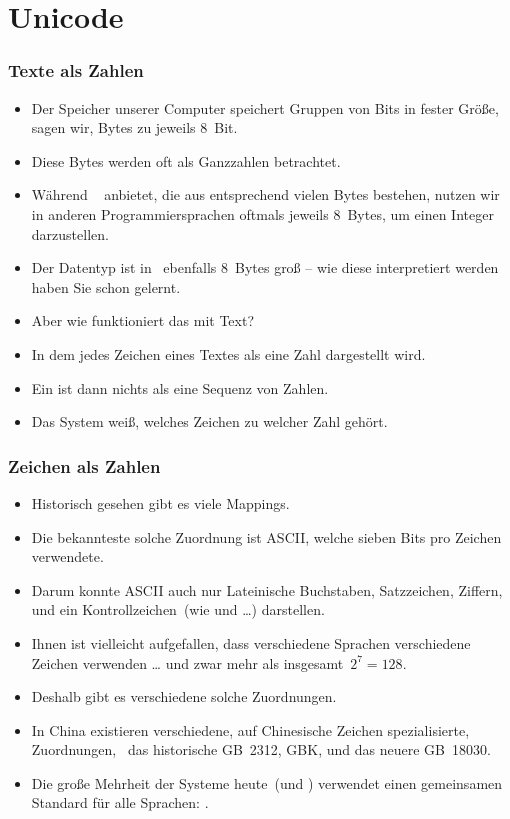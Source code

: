 \documentclass[aspectratio=169,mathserif,notheorems]{beamer}%
\begin{document}
\section{Unicode}%
%
\begin{frame}%
\frametitle{Texte als Zahlen}%
\begin{itemize}%
\item Der Speicher unserer Computer speichert Gruppen von Bits in fester Größe, sagen wir, Bytes zu jeweils 8~Bit.%
\item<2-> Diese Bytes werden oft als Ganzzahlen betrachtet.%
\item<3-> Während \python\   anbietet, die aus entsprechend vielen Bytes bestehen, nutzen wir in anderen Programmiersprachen oftmals jeweils 8~Bytes, um einen Integer darzustellen.
\item<4-> Der Datentyp  ist in \python\ ebenfalls 8~Bytes groß -- wie diese interpretiert werden haben Sie schon gelernt.%
\item<5-> Aber wie funktioniert das mit Text?%
\item<6-> In dem jedes Zeichen eines Textes als eine Zahl dargestellt wird.%
\item<7-> Ein  ist dann nichts als eine Sequenz von Zahlen.%
\item<8-> Das System weiß, welches Zeichen zu welcher Zahl gehört.
\end{itemize}%
\end{frame}%
%
\begin{frame}%
\frametitle{Zeichen als Zahlen}%
\begin{itemize}%
\item Historisch gesehen gibt es viele  Mappings.%
\item<2-> Die bekannteste solche Zuordnung ist ASCII\cite{ASA1963ASCII,USAS1967USCFII}, welche sieben Bits pro Zeichen verwendete.%
\item<3-> Darum konnte ASCII auch nur Lateinische Buchstaben, Satzzeichen, Ziffern, und ein Kontrollzeichen~(wie \textil{\\t} und \textil{\\n}\dots) darstellen.%
\item<4-> Ihnen ist vielleicht aufgefallen, dass verschiedene Sprachen verschiedene Zeichen verwenden {\dots} und zwar mehr als insgesamt~$2^7=128$.%
\item<5-> Deshalb gibt es verschiedene solche Zuordnungen.%
\item<6-> In China existieren verschiedene, auf Chinesische Zeichen spezialisierte, Zuordnungen, \DEzB\ das historische GB~2312\cite{GBT23121980PROCNSG21CCECSFIE}, GBK\cite{GBK1995CICSNSE}, und das neuere GB~18030\cite{GB180302022ITCCCS}.%
\item<7-> Die große Mehrheit der Systeme heute~(und \python) verwendet einen gemeinsamen Standard für \alert{alle} Sprachen: \cite{TUC2023U1510,TUC2023U151ACS,ISOIEC106462020ITUCCSU}.%
\end{itemize}%
\end{frame}%
\end{document}
